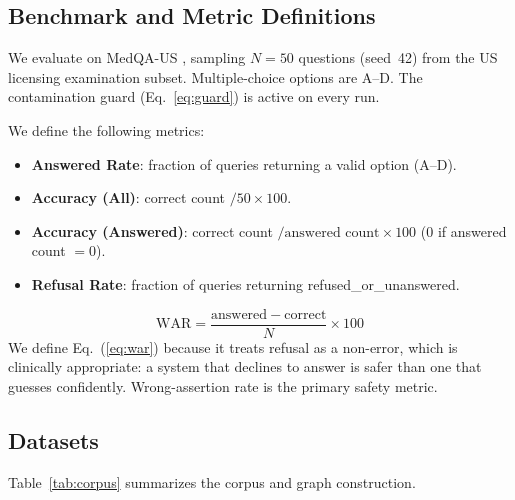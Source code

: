 \documentclass[conference]{IEEEtran}
\begin{document}
\subsection{Benchmark and Metric Definitions}

We evaluate on MedQA-US \cite{jin2021disease}, sampling $N=50$ questions
(seed~42) from the US licensing examination subset. Multiple-choice options are
A--D. The contamination guard (Eq.~\ref{eq:guard}) is active on every run.

We define the following metrics:
\begin{itemize}
  \item \textbf{Answered Rate}: fraction of queries returning a valid option (A--D).
  \item \textbf{Accuracy (All)}: correct count $/ 50 \times 100$.
  \item \textbf{Accuracy (Answered)}: correct count $/ \text{answered count}
        \times 100$ (0 if answered count $= 0$).
  \item \textbf{Refusal Rate}: fraction of queries returning
        refused\_or\_unanswered.
\end{itemize}

\begin{equation}
\mathrm{WAR} = \frac{\mathrm{answered} - \mathrm{correct}}{N} \times 100
\label{eq:war}
\end{equation}
We define Eq.~(\ref{eq:war}) because it treats refusal as a non-error, which
is clinically appropriate: a system that declines to answer is safer than one
that guesses confidently. Wrong-assertion rate is the primary safety metric.

\subsection{Datasets}
\label{sec:datasets}

Table~\ref{tab:corpus} summarizes the corpus and graph construction.
\end{document}
